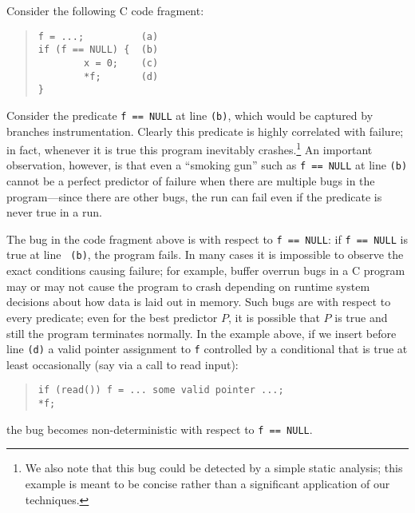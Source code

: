 Consider the following C code fragment:
\begin{quote}
\begin{verbatim}
f = ...;          (a)
if (f == NULL) {  (b)
        x = 0;    (c)
        *f;       (d)
}
\end{verbatim}
\end{quote}
Consider the predicate {\tt f == NULL} at line {\tt (b)}, which would
be captured by branches instrumentation.  Clearly
this predicate is highly correlated with failure; in fact, whenever it
is true this program inevitably crashes.\footnote{We also note that this bug could 
be detected by a simple static analysis; this example is meant to be concise rather than 
a significant application of our techniques.}   An important observation,
however, is that even a ``smoking gun'' such as {\tt f == NULL} at
line {\tt (b)} cannot be a perfect predictor of failure when there are
multiple bugs in the program---since there are other bugs, the run can fail
even if the predicate is never true in a run.

The bug in the code fragment above is  with
respect to {\tt f == NULL}: if {\tt f == NULL} is true at line {\tt
(b)}, the program fails.  In many cases it is impossible to observe
the exact conditions causing failure; for example, buffer overrun bugs
in a C program may or may not cause the program to crash depending on
runtime system decisions about how data is laid out in memory.  Such
bugs are  with respect to every predicate;
even for the best predictor $P$, it is possible
that $P$ is true and still the program terminates normally.  In the
example above, if we insert before line {\tt (d)} a valid pointer
assignment to {\tt f} controlled by a conditional that is true at
least occasionally (say via a call to read input):
\begin{quote}
\begin{verbatim}
if (read()) f = ... some valid pointer ...;
*f;
\end{verbatim}
\end{quote}
the bug becomes non-deterministic with respect to {\tt f == NULL}.

